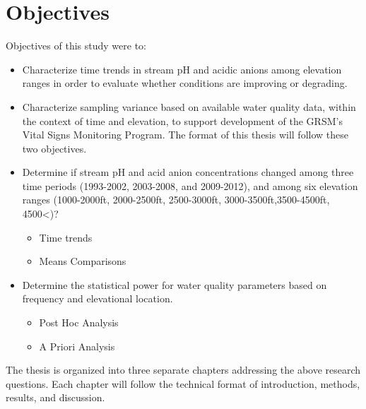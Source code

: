 \section{Objectives}
Objectives of this study were to:
\begin{itemize}
\item  Characterize time trends in stream pH and acidic anions among elevation ranges in order to evaluate whether conditions are improving or degrading.
\item Characterize sampling variance based on available water quality data, within the context of time and elevation, to support development of the GRSM’s Vital Signs Monitoring Program.  The format of this thesis will follow these two objectives.  
\end{itemize}
\begin{itemize}
\item Determine if stream pH and acid anion concentrations changed among three time periods (1993-2002, 2003-2008, and 2009-2012), and among six elevation ranges (1000-2000ft, 2000-2500ft, 2500-3000ft, 3000-3500ft,3500-4500ft, 4500<)?
\begin{itemize}
\item Time trends
 \item Means Comparisons
\end{itemize}
\item Determine the statistical power for water quality parameters based on frequency and elevational location.
\begin{itemize}
\item Post Hoc Analysis
\item A Priori Analysis
\end{itemize}
\end{itemize}
The thesis is organized into three separate chapters addressing the above research questions. Each chapter will follow the technical format of introduction, methods, results, and discussion. 




